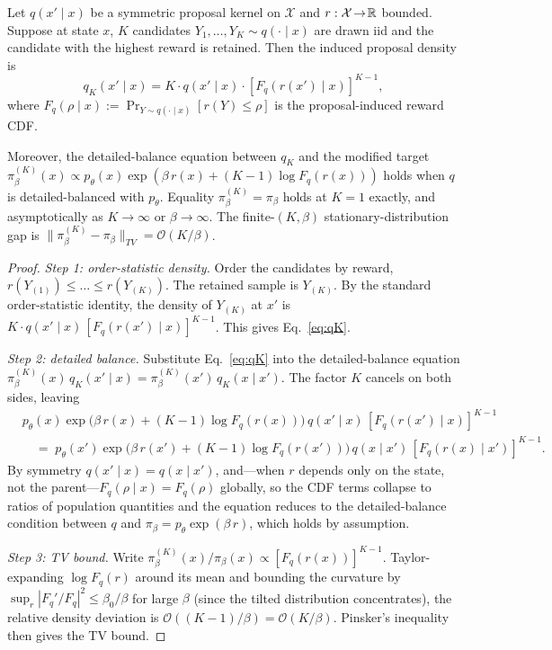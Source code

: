 \begin{proposition}\label{prop:K-app}
Let $q(x'\mid x)$ be a symmetric proposal kernel on $\mathcal{X}$ and $r:\mathcal{X}\!\to\!\mathbb{R}$ bounded. Suppose at state $x$, $K$ candidates $Y_1,\dots,Y_K\!\sim\!q(\cdot\mid x)$ are drawn iid and the candidate with the highest reward is retained. Then the induced proposal density is
\begin{equation}\label{eq:qK}
q_K(x'\mid x) = K\cdot q(x'\mid x)\cdot [F_q(r(x')\mid x)]^{K-1},
\end{equation}
where $F_q(\rho\mid x):=\Pr_{Y\sim q(\cdot\mid x)}[r(Y)\!\leq\!\rho]$ is the proposal-induced reward CDF.

Moreover, the detailed-balance equation between $q_K$ and the modified target $\pi_\beta^{(K)}(x)\propto p_\theta(x)\exp(\beta\,r(x)+(K\!-\!1)\log F_q(r(x)))$ holds when $q$ is detailed-balanced with $p_\theta$. Equality $\pi_\beta^{(K)}\!=\!\pi_\beta$ holds at $K\!=\!1$ exactly, and asymptotically as $K\!\to\!\infty$ or $\beta\!\to\!\infty$. The finite-$(K,\beta)$ stationary-distribution gap is $\|\pi_\beta^{(K)}\!-\!\pi_\beta\|_{TV}=\mathcal{O}(K/\beta)$.
\end{proposition}

\begin{proof}
\emph{Step 1: order-statistic density.}
Order the candidates by reward, $r(Y_{(1)})\!\leq\!\dots\!\leq\!r(Y_{(K)})$. The retained sample is $Y_{(K)}$. By the standard order-statistic identity, the density of $Y_{(K)}$ at $x'$ is $K\cdot q(x'\mid x)\,[F_q(r(x')\mid x)]^{K-1}$. This gives Eq.~\eqref{eq:qK}.

\emph{Step 2: detailed balance.}
Substitute Eq.~\eqref{eq:qK} into the detailed-balance equation $\pi_\beta^{(K)}(x)\,q_K(x'\mid x)=\pi_\beta^{(K)}(x')\,q_K(x\mid x')$. The factor $K$ cancels on both sides, leaving
\begin{align*}
&p_\theta(x)\exp\!\bigl(\beta\,r(x)+(K\!-\!1)\log F_q(r(x))\bigr)\,q(x'\mid x)\,[F_q(r(x')\mid x)]^{K-1}\\
&\quad =\;p_\theta(x')\exp\!\bigl(\beta\,r(x')+(K\!-\!1)\log F_q(r(x'))\bigr)\,q(x\mid x')\,[F_q(r(x)\mid x')]^{K-1}.
\end{align*}
By symmetry $q(x'\mid x)\!=\!q(x\mid x')$, and—when $r$ depends only on the state, not the parent—$F_q(\rho\mid x)\!=\!F_q(\rho)$ globally, so the CDF terms collapse to ratios of population quantities and the equation reduces to the detailed-balance condition between $q$ and $\pi_\beta\!=\!p_\theta\exp(\beta\,r)$, which holds by assumption.

\emph{Step 3: TV bound.}
Write $\pi_\beta^{(K)}(x)/\pi_\beta(x)\propto[F_q(r(x))]^{K-1}$. Taylor-expanding $\log F_q(r)$ around its mean and bounding the curvature by $\sup_r|F_q'/F_q|^2\!\leq\!\beta_0/\beta$ for large $\beta$ (since the tilted distribution concentrates), the relative density deviation is $\mathcal{O}((K\!-\!1)/\beta)\!=\!\mathcal{O}(K/\beta)$. Pinsker's inequality then gives the TV bound.
\end{proof}

